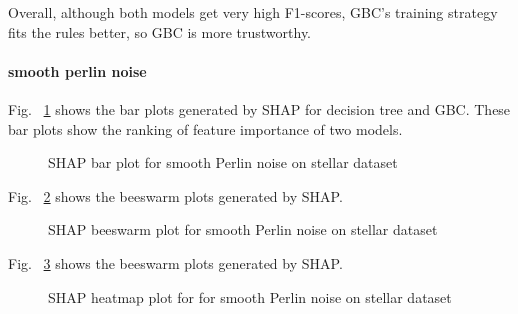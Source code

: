 \documentclass[runningheads,a4paper]{llncs}
\begin{document}
Overall, although both models get very high F1-scores, GBC's training strategy fits the rules better, so GBC is more trustworthy.

\paragraph{smooth perlin noise}

Fig. ~\ref{bar plots smooth noise stellar} shows the bar plots generated by SHAP for decision tree and GBC. These bar plots show the ranking of feature importance of two models.
\begin{figure}[H]
	\centering
	
	\hfill
	
	
	\caption{SHAP bar plot for smooth Perlin noise on stellar dataset}
	\label{bar plots smooth noise stellar}
\end{figure}



Fig. ~\ref{bee plots smooth noise stellar} shows the beeswarm plots generated by SHAP.
\begin{figure}[H]
	\centering
	
	\hfill
	
	
	\caption{SHAP beeswarm plot for smooth Perlin noise on stellar dataset}
	\label{bee plots smooth noise stellar}
	
\end{figure}
Fig. ~\ref{heat plots smooth noise stellar} shows the beeswarm plots generated by SHAP.
\begin{figure}[H]
	\centering
	
	\hfill
	
	
	\caption{SHAP heatmap plot for for smooth Perlin noise  on stellar dataset}
	\label{heat plots smooth noise stellar}
	
\end{figure}
\end{document}
